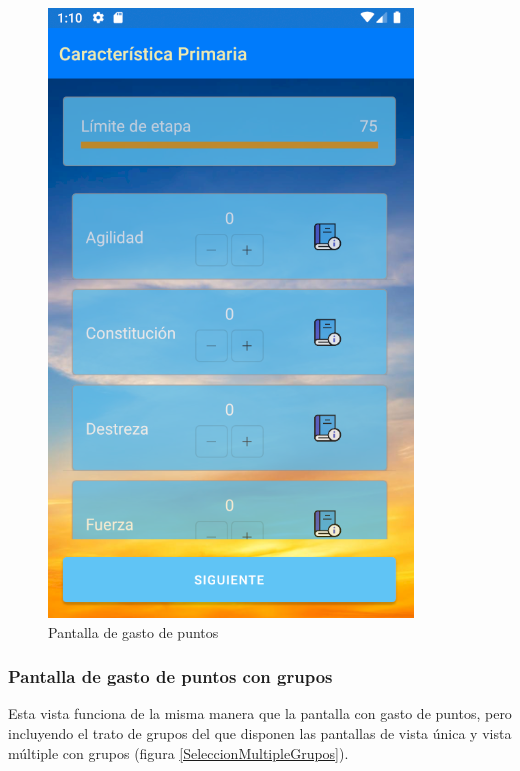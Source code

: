 \begin{figure}[H]
    \centering
    \includegraphics[scale=0.7]{Figures/Capturas/GastoPuntos.png}
    \caption{Pantalla de gasto de puntos}
    \label{GastoPuntos}    
\end{figure}

\subsubsection{Pantalla de gasto de puntos con grupos}
Esta vista funciona de la misma manera que la pantalla con gasto de puntos, pero incluyendo el trato de grupos del 
que disponen las pantallas de vista única y vista múltiple con grupos (figura \ref*{SeleccionMultipleGrupos}).

